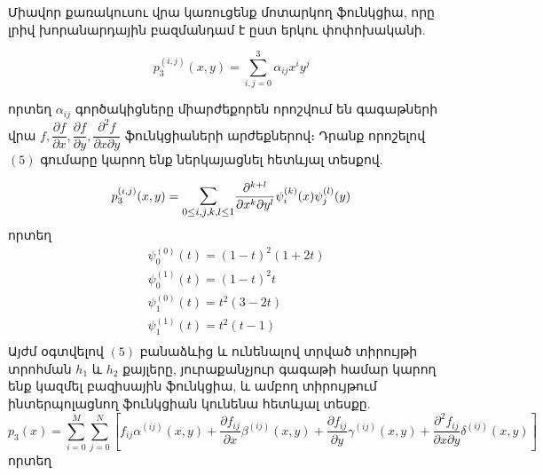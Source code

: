 \documentclass[fleqn, bachelor,subf,12pt,notitlepage]{article}
\begin{document}
Միավոր քառակուսու վրա կառուցենք մոտարկող ֆունկցիա, որը լրիվ խորանարդային բազմանդամ է ըստ երկու փոփոխականի.

\begin{equation}
			p_{3}^{(i, j)}(x, y)=\sum_{i, j=0}^{3}\alpha_{ij}x^{i}y^{j}
\end{equation}

որտեղ $\alpha_{ij}$ գործակիցները միարժեքորեն որոշվում են գագաթների վրա $f, \dfrac{\partial f}{\partial x}, \dfrac{\partial f}{\partial y}, \dfrac{\partial^{2} f}{\partial x \partial y}$ ֆունկցիաների արժեքներով։ Դրանք որոշելով $\left(5\right)$ գումարը կարող ենք ներկայացնել հետևյալ տեսքով.

\begin{equation}
			p_{3}^{(i, j)}(x, y)= \mathlarger{\sum_{0 \leq i, j, k, l \leq 1}} \dfrac{\partial^{k+l}}{\partial x^{k} \partial y^{l}}  \psi_{i}^{(k)}(x)\psi_{j}^{(l)}(y)
\end{equation}
որտեղ
\begin{equation*}
\begin{aligned}
&\psi_{0}^{(0)}(t) = \left(1-t\right)^{2}\left(1+2t\right) \\
&\psi_{0}^{(1)}(t) = \left(1-t\right)^{2}t \\
&\psi_{1}^{(0)}(t) = t^{2}\left(3-2t\right) \\
&\psi_{1}^{(1)}(t) = t^{2}\left(t-1\right) \\
\end{aligned}
\end{equation*}
Այժմ օգտվելով $\left(5\right)$ բանաձևից և ունենալով տրված տիրույթի տրոհման $h_{1}$ և $h_{2}$ քայլերը, յուրաքանչյուր գագաթի համար կարող ենք կազմել բազիսային ֆունկցիա, և ամբող տիրույթում ինտերպոլացնող ֆունկցիան կունենա հետևյալ տեսքը.
\begin{equation}
p_{3}(x)=\sum_{i=0}^{M}\sum_{j=0}^{N}\left[f_{ij}\alpha^{(ij)}\left(x,y\right)+\dfrac{\partial f_{ij}}{\partial x}\beta^{(ij)}\left(x,y\right) +\dfrac{\partial f_{ij}}{\partial y}\gamma^{(ij)}\left(x,y\right) +\dfrac{\partial^{2} f_{ij}}{\partial x\partial y}\delta^{(ij)}\left(x,y\right)\right]
\end{equation}
որտեղ
\end{document}
